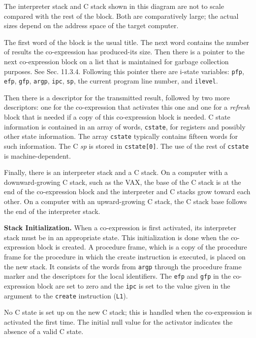The interpreter stack and C stack shown in this diagram are not to
scale compared with the rest of the block. Both are comparatively
large; the actual sizes depend on the address space of the target
computer.


The first word of the block is the usual title. The next word contains
the number of results the co-expression has produced-its
{\textquotedbl}size.{\textquotedbl} Then there is a pointer to the
next co-expression block on a list that is maintained for garbage
collection purposes. See Sec. 11.3.4. Following this pointer there are
i-state variables: \texttt{pfp}, \texttt{efp}, \texttt{gfp},
\texttt{argp}, \texttt{ipc}, \texttt{sp}, the current program line
number, and \texttt{ilevel}.

Then there is a descriptor for the transmitted result, followed by two
more descriptors: one for the co-expression that activates this one
and one for a \textit{refresh} block that is needed if a copy of this
co-expression block is needed.  C state information is contained in an
array of words, \texttt{cstate}, for registers and possibly other
state information. The array \texttt{cstate} typically contains
fifteen words for such information. The C \textit{sp} is stored in
\texttt{cstate[0]}. The use of the rest of \texttt{cstate} is
machine-dependent.

Finally, there is an interpreter stack and a C stack. On a computer
with a downward-growing C stack, such as the VAX, the base of the C
stack is at the end of the co-expression block and the interpreter and
C stacks grow toward each other. On a computer with an upward-growing
C stack, the C stack base follows the end of the interpreter stack.

\textbf{Stack Initialization.} When a co-expression is first
activated, its interpreter stack must be in an appropriate state. This
initialization is done when the co-expression block is created. A
procedure frame, which is a copy of the procedure frame for the
procedure in which the create instruction is executed, is placed on
the new stack. It consists of the words from \texttt{argp} through the
procedure frame marker and the descriptors for the local
identifiers. The \texttt{efp} and \texttt{gfp} in the co-expression
block are set to zero and the \texttt{ipc} is set to the value given
in the argument to the \texttt{create} instruction (\texttt{L1}).

No C state is set up on the new C stack; this is handled when the
co-expression is activated the first time. The initial null value for
the activator indicates the absence of a valid C state.



